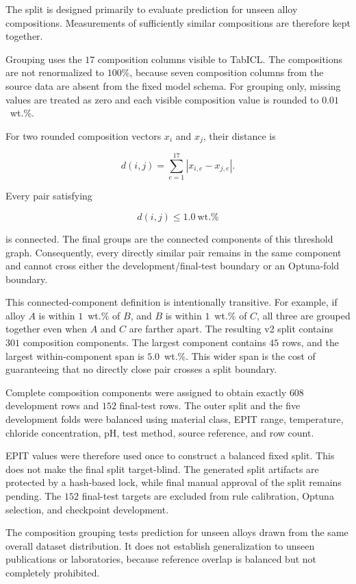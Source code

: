 \documentclass{article}
\begin{document}
The split is designed primarily to evaluate prediction for unseen alloy
compositions. Measurements of sufficiently similar compositions are therefore
kept together.

Grouping uses the \(17\) composition columns visible to TabICL. The
compositions are not renormalized to \(100\%\), because seven composition
columns from the source data are absent from the fixed model schema.
For grouping only, missing values are treated as zero and each visible
composition value is rounded to \(0.01\)~wt.\%.

For two rounded composition vectors \(x_i\) and \(x_j\), their distance is

\[
d(i,j)
=
\sum_{e=1}^{17}
\left|x_{i,e}-x_{j,e}\right|.
\]

Every pair satisfying

\[
d(i,j)\leq 1.0\ \text{wt.\%}
\]

is connected. The final groups are the connected components of this
threshold graph. Consequently, every directly similar pair remains in the
same component and cannot cross either the development/final-test boundary or
an Optuna-fold boundary.

This connected-component definition is intentionally transitive. For example,
if alloy \(A\) is within \(1\)~wt.\% of \(B\), and \(B\) is within
\(1\)~wt.\% of \(C\), all three are grouped together even when \(A\) and \(C\)
are farther apart. The resulting v2 split contains \(301\) composition
components. The largest component contains \(45\) rows, and the largest
within-component span is \(5.0\)~wt.\%. This wider span is the cost of
guaranteeing that no directly close pair crosses a split boundary.

Complete composition components were assigned to obtain exactly \(608\)
development rows and \(152\) final-test rows. The outer split and the five
development folds were balanced using material class, EPIT range,
temperature, chloride concentration, pH, test method, source reference, and
row count.

EPIT values were therefore used once to construct a balanced fixed split. This
does not make the final split target-blind. The generated split artifacts are
protected by a hash-based lock, while final manual approval of the split
remains pending. The \(152\) final-test targets are excluded from rule
calibration, Optuna selection, and checkpoint development.

The composition grouping tests prediction for unseen alloys drawn from the
same overall dataset distribution. It does not establish generalization to
unseen publications or laboratories, because reference overlap is balanced
but not completely prohibited.
\end{document}
